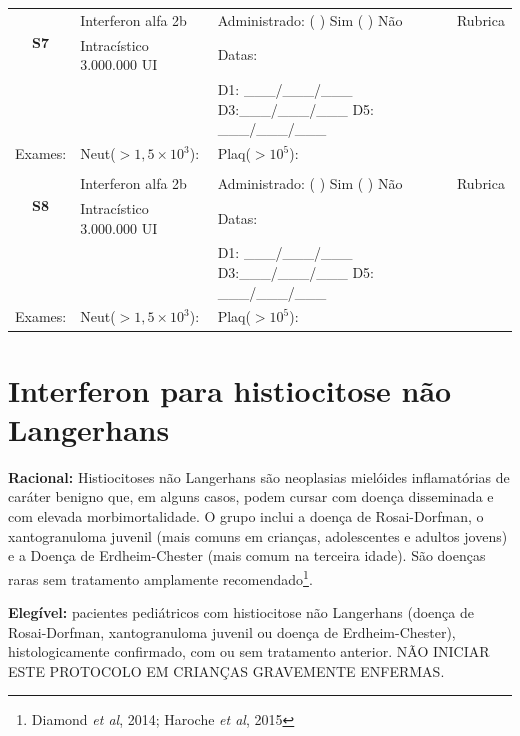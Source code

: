 \documentclass[11pt,a4paper,oldfontcommands]{memoir}
\begin{document}
\begin{center}
\begin{table}[H]
\begin{tabular}{p{1.3cm}p{4.2cm}|p{8cm}|p{}}
    \hline
    \multicolumn{1}{c|}{\multirow{2}{*}{\textbf{S7}}}&{Interferon alfa 2b}&{Administrado: (  ) Sim (  ) Não}&{Rubrica}\\
    \multicolumn{1}{c|}{}&{Intracístico 3.000.000 UI}&{Datas:}&\\
    \multicolumn{1}{c|}{}&{}&{D1: \_\_\_/\_\_\_/\_\_\_ D3:\_\_\_/\_\_\_/\_\_\_ D5: \_\_\_/\_\_\_/\_\_\_}&\\
    \hline
    {Exames:}&{Neut(\(>1,5\times10^3\)):}&{Plaq(\(>10^5\)):}&{}
    \\
    \hline
    \\
    \hline
    \multicolumn{1}{c|}{\multirow{2}{*}{\textbf{S8}}}&{Interferon alfa 2b}&{Administrado: (  ) Sim (  ) Não}&{Rubrica}\\
    \multicolumn{1}{c|}{}&{Intracístico 3.000.000 UI}&{Datas:}&\\
    \multicolumn{1}{c|}{}&{}&{D1: \_\_\_/\_\_\_/\_\_\_ D3:\_\_\_/\_\_\_/\_\_\_ D5: \_\_\_/\_\_\_/\_\_\_}&\\
    \hline
    {Exames:}&{Neut(\(>1,5\times10^3\)):}&{Plaq(\(>10^5\)):}&{}
    \\
    \hline
\end{tabular}
\end{table}
\end{center}

\section{Interferon para histiocitose não Langerhans}
{\let\thefootnote\relax{}}

\textbf{Racional:} Histiocitoses não Langerhans são neoplasias mielóides inflamatórias de caráter benigno que, em alguns casos, podem cursar com doença disseminada e com elevada morbimortalidade. O grupo inclui a doença de Rosai-Dorfman, o xantogranuloma juvenil (mais comuns em crianças, adolescentes e adultos jovens) e a Doença de Erdheim-Chester (mais comum na terceira idade). São doenças raras sem tratamento amplamente recomendado\footnote{Diamond \textit{et al}, 2014; Haroche \textit{et al}, 2015}.

\textbf{Elegível:} pacientes pediátricos com histiocitose não Langerhans (doença de Rosai-Dorfman, xantogranuloma juvenil ou doença de Erdheim-Chester), histologicamente confirmado, com ou sem tratamento anterior. NÃO INICIAR ESTE PROTOCOLO EM CRIANÇAS GRAVEMENTE ENFERMAS.
\end{document}
